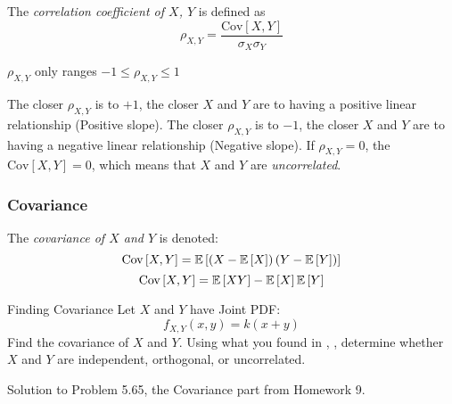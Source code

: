 			\begin{definition} \label{def:Correlation Coefficient}
				The \emph{correlation coefficient of $X$, $Y$} is defined as
				\begin{equation} \label{eq:Correlation Coefficient}
					\rho_{X,Y} = \frac{\text{Cov} \left[ X,Y \right]}{\sigma_{X} \sigma_{Y}}
				\end{equation}
				\begin{remark}
					$\rho_{X,Y}$ only ranges $-1 \leq \rho_{X,Y} \leq 1$
				\end{remark}
				\begin{remark}
					The closer $\rho_{X,Y}$ is to $+1$, the closer $X$ and $Y$ are to having a positive linear relationship (Positive slope). \newline
					The closer $\rho_{X,Y}$ is to $-1$, the closer $X$ and $Y$ are to having a negative linear relationship (Negative slope). \newline
					If $\rho_{X,Y} = 0$, the $\text{Cov}\left[ X,Y \right] = 0$, which means that $X$ and $Y$ are \emph{uncorrelated}.
				\end{remark}
			\end{definition}
			
		\subsubsection{Covariance} \label{subsubsec:Covariance}
			\begin{definition}[Covariance] \label{def:Covariance}
				The \emph{covariance of $X$ and $Y$} is denoted:
				\begin{equation} \label{eq:Covariance-Form 1}
					\text{Cov} \left[ X,Y \right] = \operatorname{\operatorname{\mathbb{E}}} \left[ \left( X - \operatorname{\operatorname{\mathbb{E}}} \left[ X \right] \right) \left( Y - \operatorname{\operatorname{\mathbb{E}}} \left[ Y \right] \right)\right]
				\end{equation}
				\begin{equation} \label{eq:Covariance-Form 2}
					\text{Cov} \left[ X,Y \right] = \operatorname{\operatorname{\mathbb{E}}} \left[ XY \right] - \operatorname{\operatorname{\mathbb{E}}} \left[ X \right] \operatorname{\operatorname{\mathbb{E}}} \left[ Y \right]
				\end{equation}
			\end{definition}
			\begin{example}[Problem 5.65]{Finding Covariance}
                          Let $X$ and $Y$ have Joint PDF:
                          \begin{equation*}
                            f_{X,Y} \left( x,y \right) = k \left( x+y \right)
                          \end{equation*}
                          Find the covariance of $X$ and $Y$.
                          Using what you found in , , determine whether $X$ and $Y$ are independent, orthogonal, or uncorrelated.

                          \tcblower
				Solution to Problem 5.65, the Covariance part from Homework 9.
			\end{example}
		
